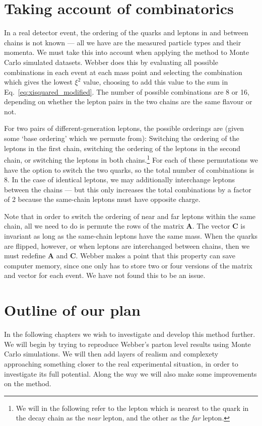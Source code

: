 \documentclass[twoside,english]{uiofysmaster}
\begin{document}
\section{Taking account of combinatorics}
\label{sec:combinatorics}
In a real detector event, the ordering of the quarks and leptons in and between chains is not known --- all we have are the measured particle types and their momenta. We must take this into account when applying the method to Monte Carlo simulated datasets. Webber does this by evaluating all possible combinations in each event at each mass point and selecting the combination which gives the lowest $\xi^2$ value, choosing to add this value to the sum in Eq.\ \eqref{eq:xisquared_modified}. The number of possible combinations are 8 or 16, depending on whether the lepton pairs in the two chains are the same flavour or not. 

For two pairs of different-generation leptons, the possible orderings are (given some `base ordering' which we permute from): Switching the ordering of the leptons in the first chain, switching the ordering of the leptons in the second chain, or switching the leptons in both chains.\footnote{We will in the following refer to the lepton which is nearest to the quark in the decay chain as the {\it near} lepton, and the other as the {\it far} lepton.} For each of these permutations we have the option to switch the two quarks, so the total number of combinations is 8. In the case of identical leptons, we may additionally interchange leptons between the chains --- but this only increases the total combinations by a factor of 2 because the same-chain leptons must have opposite charge.

Note that in order to switch the ordering of near and far leptons within the same chain, all we need to do is permute the rows of the matrix $\mathbf{A}$. The vector $\mathbf{C}$ is invariant as long as the same-chain leptons have the same mass. When the quarks are flipped, however, or when leptons are interchanged between chains, then we must redefine $\mathbf{A}$ and $\mathbf{C}$. Webber makes a point that this property can save computer memory, since one only has to store two or four versions of the matrix and vector for each event. We have not found this to be an issue.












\section{Outline of our plan}
In the following chapters we wish to investigate and develop this method further. We will begin by trying to reproduce Webber's parton level results using Monte Carlo simulations. We will then add layers of realism and complexety approaching something closer to the real experimental situation, in order to investigate its full potential. Along the way we will also make some improvements on the method.
\end{document}
